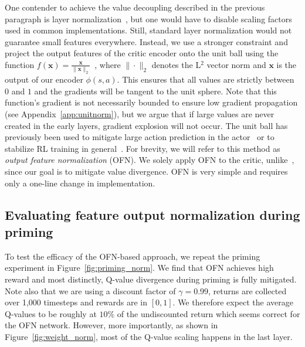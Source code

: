 One contender to achieve the value decoupling described in the previous paragraph is layer normalization~\parencite{ba2016layer}, but one would have to disable scaling factors used in common implementations. Still, standard layer normalization would not guarantee small features everywhere. Instead, we use a stronger constraint and project the output features of the critic encoder onto the unit ball using the function
$f(\mathbf{x}) = \frac{\mathbf{x} }{\|\mathbf{x}\|_2}$~\parencite{zhang2019root}, 
where $\|\cdot\|_2$ denotes the L$^2$ vector norm and $\mathbf{x}$ is the output of our encoder $\phi(s, a)$. This ensures that all values are strictly between $0$ and $1$ and the gradients will be tangent to the unit sphere. Note that this function's gradient is not necessarily bounded to ensure low gradient propagation (see Appendix~\ref{app:unitnorm}), but we argue that if large values are never created in the early layers, gradient explosion will not occur. The unit ball has previously been used to mitigate large action prediction in the actor~\parencite{wang2020striving} or to stabilize RL training in general~\parencite{bjorck2022is}. 
For brevity, we will refer to this method as {\em output feature normalization} (OFN). We solely apply OFN to the critic, unlike~\textcite{wang2020striving}, since our goal is to mitigate value divergence. OFN is very simple and requires only a one-line change in implementation.




\subsection{Evaluating feature output normalization during priming} \label{sec:evalmethod}

To test the efficacy of the OFN-based approach, we repeat the priming experiment in Figure~\ref{fig:priming_norm}.
We find that OFN achieves high reward and most distinctly, Q-value divergence during priming is fully mitigated. 
Note also that we are using a discount factor of $\gamma = 0.99$, returns are collected over 1,000 timesteps and rewards are in $[0, 1]$. 
We therefore expect the average Q-values to be roughly at $10\%$ of the undiscounted return which seems correct for the OFN network. 
However, more importantly, as shown in Figure~\ref{fig:weight_norm}, most of the Q-value scaling happens in the last layer.


